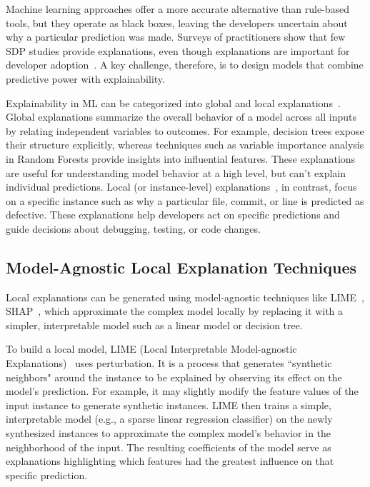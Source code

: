 \documentclass[\main/thesis.tex]{subfiles}
\begin{document}
Machine learning approaches offer a more accurate alternative than rule-based tools, but they operate as black boxes, leaving the developers uncertain about why a particular prediction was made. 
Surveys of practitioners show that few SDP studies provide explanations, even though explanations are important for developer adoption~\cite{jiarpakdee2021practitioners}. A key challenge, therefore, is to design models that combine predictive power with explainability.


Explainability in ML can be categorized into global and local explanations~\cite{menzies2011local}. Global explanations summarize the overall behavior of a model across all inputs by relating independent variables to outcomes. For example, decision trees expose their structure explicitly, whereas techniques such as variable importance analysis in Random Forests provide insights into influential features. These explanations are useful for understanding model behavior at a high level, but can't explain individual predictions.
Local (or instance-level) explanations~\cite{jiarpakdee2020empirical}, in contrast, focus on a specific instance such as why a particular file, commit, or line is predicted as defective. These explanations help developers act on specific predictions and guide decisions about debugging, testing, or code changes.


\subsection{Model-Agnostic Local Explanation Techniques}
Local explanations can be generated using model-agnostic techniques like LIME~\cite{ribeiro2016should}, SHAP~\cite{lundberg2017unified}, which  approximate the complex model locally by replacing it with a simpler, interpretable model such as a linear model or decision tree.

To build a local model, LIME (Local Interpretable Model-agnostic Explanations)~\cite{ribeiro2016should} uses perturbation. It is a process that generates ``synthetic neighbors" around the instance to be explained by observing its effect on the model's prediction. For example, it may slightly modify the feature values of the input instance to generate synthetic instances. LIME then trains a simple, interpretable model (e.g., a sparse linear regression classifier) on the newly synthesized instances to approximate the complex model's behavior in the neighborhood of the input. The resulting coefficients of the model serve as explanations highlighting which features had the greatest influence on that specific prediction.
\end{document}
